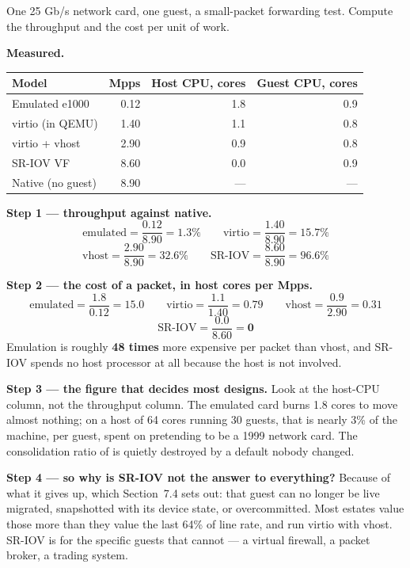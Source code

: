 \begin{worked}
One 25 Gb/s network card, one guest, a small-packet forwarding test. Compute
the throughput and the cost per unit of work.

\smallskip
\textbf{Measured.}
\begin{center}
\begin{tabular}{@{}L{3.5cm}rrr@{}}
\toprule
{}
\textbf{Model} & \textbf{Mpps} & \textbf{Host CPU, cores} &
\textbf{Guest CPU, cores} \\
\midrule
Emulated e1000  & 0.12 & 1.8 & 0.9 \\
virtio (in QEMU) & 1.40 & 1.1 & 0.8 \\
virtio + vhost  & 2.90 & 0.9 & 0.8 \\
SR-IOV VF       & 8.60 & 0.0 & 0.9 \\
Native (no guest) & 8.90 & --- & --- \\
\bottomrule
\end{tabular}
\end{center}

\smallskip
\textbf{Step 1 --- throughput against native.}
\[ \text{emulated} = \frac{0.12}{8.90} = \mathbf{1.3\%} \qquad
   \text{virtio} = \frac{1.40}{8.90} = \mathbf{15.7\%} \]
\[ \text{vhost} = \frac{2.90}{8.90} = \mathbf{32.6\%} \qquad
   \text{SR-IOV} = \frac{8.60}{8.90} = \mathbf{96.6\%} \]

\smallskip
\textbf{Step 2 --- the cost of a packet, in host cores per Mpps.}
\[ \text{emulated} = \frac{1.8}{0.12} = 15.0 \qquad
   \text{virtio} = \frac{1.1}{1.40} = 0.79 \qquad
   \text{vhost} = \frac{0.9}{2.90} = 0.31 \]
\[ \text{SR-IOV} = \frac{0.0}{8.60} = \mathbf{0} \]
Emulation is roughly \textbf{48 times} more expensive per packet than vhost,
and SR-IOV spends no host processor at all because the host is not involved.

\smallskip
\textbf{Step 3 --- the figure that decides most designs.} Look at the host-CPU
column, not the throughput column. The emulated card burns 1.8 cores to move
almost nothing; on a host of 64 cores running 30 guests, that is nearly 3\% of
the machine, per guest, spent on pretending to be a 1999 network card. The
consolidation ratio of  is quietly destroyed by a default nobody
changed.

\smallskip
\textbf{Step 4 --- so why is SR-IOV not the answer to everything?} Because of
what it gives up, which Section~7.4 sets out: that guest can no longer be live
migrated, snapshotted with its device state, or overcommitted. Most estates
value those more than they value the last 64\% of line rate, and run virtio
with vhost. SR-IOV is for the specific guests that cannot --- a virtual
firewall, a packet broker, a trading system.
\end{worked}


